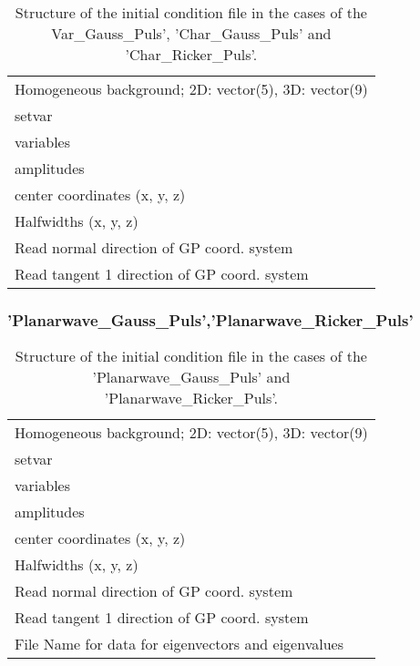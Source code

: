 \documentclass[12pt,twoside]{article}
\begin{document}
\begin{table}[H]
\caption{Structure of the initial condition file in the cases of the Var\_Gauss\_Puls', 'Char\_Gauss\_Puls' and 'Char\_Ricker\_Puls'.}
\begin{center}
\begin{tabular}{l}
\hline
Homogeneous background; 2D: vector(5), 3D: vector(9)\\
setvar\\
variables\\
amplitudes\\
center coordinates (x, y, z)\\
Halfwidths (x, y, z)\\
Read normal direction of GP coord. system\\
Read tangent 1 direction of GP coord. system\\
\hline
\end{tabular}
\end{center}
\label{ini1-file}
\end{table}





\subsubsection{'Planarwave\_Gauss\_Puls','Planarwave\_Ricker\_Puls'}

\begin{table}[H]
\caption{Structure of the initial condition file in the cases of the 'Planarwave\_Gauss\_Puls' and 'Planarwave\_Ricker\_Puls'.}
\begin{center}
\begin{tabular}{l}
\hline
Homogeneous background; 2D: vector(5), 3D: vector(9)\\
setvar\\
variables\\
amplitudes\\
center coordinates (x, y, z)\\
Halfwidths (x, y, z)\\
Read normal direction of GP coord. system\\
Read tangent 1 direction of GP coord. system\\
File Name for data for eigenvectors and eigenvalues\\
\hline
\end{tabular}
\end{center}
\label{ini2-file}
\end{table}
\end{document}
